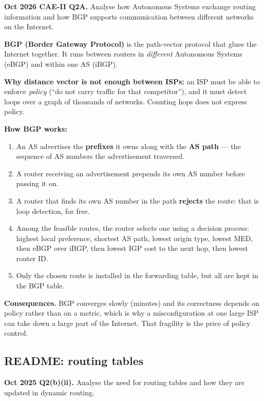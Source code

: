\documentclass[11pt,a4paper]{article}
\begin{document}
\begin{pyqbox}
\textbf{Oct 2026 CAE-II Q2A.} Analyse how Autonomous Systems exchange routing information and how BGP supports communication between different networks on the Internet.
\end{pyqbox}

\begin{solbox}
\textbf{BGP (Border Gateway Protocol)} is the path-vector protocol that glues the Internet together. It runs between routers in \emph{different} Autonomous Systems (eBGP) and within one AS (iBGP).

\textbf{Why distance vector is not enough between ISPs:} an ISP must be able to enforce \emph{policy} (``do not carry traffic for that competitor''), and it must detect loops over a graph of thousands of networks. Counting hops does not express policy.

\textbf{How BGP works:}
\begin{enumerate}
\item An AS advertises the \textbf{prefixes} it owns along with the \textbf{AS path} --- the sequence of AS numbers the advertisement traversed.
\item A router receiving an advertisement prepends its own AS number before passing it on.
\item A router that finds its own AS number in the path \textbf{rejects} the route: that is loop detection, for free.
\item Among the feasible routes, the router selects one using a decision process: highest local preference, shortest AS path, lowest origin type, lowest MED, then eBGP over iBGP, then lowest IGP cost to the next hop, then lowest router ID.
\item Only the chosen route is installed in the forwarding table, but all are kept in the BGP table.
\end{enumerate}

\textbf{Consequences.} BGP converges slowly (minutes) and its correctness depends on policy rather than on a metric, which is why a misconfiguration at one large ISP can take down a large part of the Internet. That fragility is the price of policy control.
\end{solbox}

\subsection{README: routing tables}

\begin{pyqbox}
\textbf{Oct 2025 Q2(b)(ii).} Analyse the need for routing tables and how they are updated in dynamic routing.
\end{pyqbox}
\end{document}
